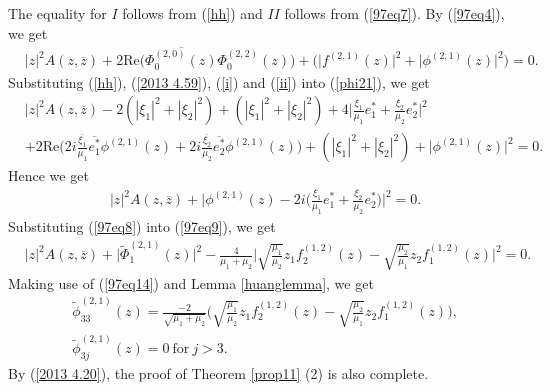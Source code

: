 \documentclass[12pt]{article}
\numberwithin{equation}{section}
\def\w{\widetilde}
\def\ov{\overline}
\begin{document}
The equality for $I$ follows from (\ref{hh}) and  $II$ follows from
(\ref{97eq7}). By (\ref{97eq4}), we get
\begin{equation}\begin{split}\label{phi21}
&|z|^2A(z,\ov{z})+2\text{Re}\big(\ov{\Phi_0^{(2,0)}(z)}\Phi_0^{(2,2)}(z)\big)
+\big(\big|f^{(2,1)}(z)\big|^2+\big|\phi^{(2,1)}(z)\big|^2\big)=0.
\end{split}\end{equation}
Substituting  (\ref{hh}), (\ref{2013 4.59}), (\ref{i}) and
(\ref{ii}) into (\ref{phi21}), we get
\begin{equation}\begin{split}
&|z|^2A(z,\ov{z})-2(|\xi_1|^2+|\xi_2|^2)+(|\xi_1|^2+|\xi_2|^2)
+4\big|\frac{\xi_1}{\mu_1}e^*_1+\frac{\xi_2}{\mu_2}e^*_2\big|^2\\
&+2\text{Re}\Big(2i\frac{\ov{\xi_1}}{\mu_1}\ov{e^*_1}\phi^{(2,1)}(z)
     +2i\frac{\ov{\xi_2}}{\mu_2}\ov{e^*_2}\phi^{(2,1)}(z)\Big)+(|\xi_1|^2+|\xi_2|^2)+\big|\phi^{(2,1)}(z)\big|^2=0.
\end{split}\end{equation}
Hence we get
\begin{equation}\begin{split}\label{97eq9}
&|z|^2A(z,\ov{z})+\Big|\phi^{(2,1)}\text{{$(z)$}}
-2i\big(\frac{\xi_1}{\mu_1}e^*_1+\frac{\xi_2}{\mu_2}e^*_2\big)\Big|^2=0.
\end{split}\end{equation}
Substituting (\ref{97eq8}) into (\ref{97eq9}), we get
\begin{equation}\begin{split}
&|z|^2A(z,\ov{z})+\Big|\w{\Phi}_1^{(2,1)}(z)\Big|^2
-\frac{4}{\mu_1+\mu_2}\Big|\sqrt{\frac{\mu_1}{\mu_2}}z_1f_2^{(1,2)}(z)
-\sqrt{\frac{\mu_2}{\mu_1}}z_2f_1^{(1,2)}(z)\Big|^2=0.
\end{split}\end{equation}
Making use of (\ref{97eq14}) and  Lemma \ref{huanglemma}, we get
\begin{equation}\begin{split}
&\w{\phi}_{33}^{(2,1)}(z)= \frac{-2}{\sqrt{\mu_1+\mu_2}}
\Big(\sqrt{\frac{\mu_1}{\mu_2}}z_1f_2^{(1,2)}(z)
-\sqrt{\frac{\mu_2}{\mu_1}}z_2f_1^{(1,2)}(z)\Big),\\
&\w{\phi}_{3j}^{(2,1)}(z)=0\ \text{for}\ j>3.
\end{split}\end{equation}
By (\ref{2013 4.20}), the proof of Theorem \ref{prop11} (2) is also complete.
\end{document}
